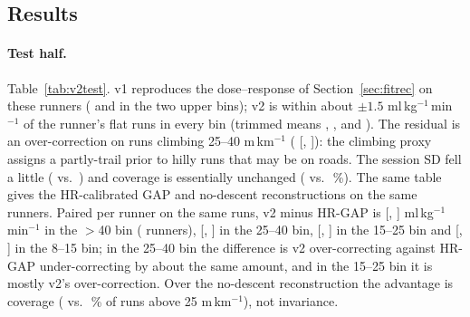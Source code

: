 \documentclass[11pt,a4paper]{article}
\newcommand{\unit}{ml\,kg$^{-1}$\,min$^{-1}$}
\begin{document}
\begin{table}[!htbp]\centering\footnotesize
\caption{Development half of the Endomondo runners (\nnVdevRunners{} runners): gap to the runner's flat runs in the 25--40 and $>$40 m\,km$^{-1}$ bins (10\,\% trimmed mean, \unit), session-to-session SD within runner on flat runs, share of runs above 25 m\,km$^{-1}$ with an estimate, and mean level on flat runs. No gait labels in every row.}\label{tab:v2dev}

\end{table}

\subsection{Results}\label{sec:v2res}
\paragraph{Test half.} Table~\ref{tab:v2test}. v1 reproduces the dose--response of Section~\ref{sec:fitrec} on these runners (\nvtestCOne{} and \nvtestDOne{} in the two upper bins); v2 is within about $\pm1.5$ \unit{} of the runner's flat runs in every bin (trimmed means \nvtestATwo, \nvtestBTwo, \nvtestCTwo{} and \nvtestDTwo). The residual is an over-correction on runs climbing 25--40 m\,km$^{-1}$ (\nvtestCTwo{} [\nvtestLoCTwo, \nvtestHiCTwo]): the climbing proxy assigns a partly-trail prior to hilly runs that may be on roads. The session SD fell a little (\nvtestSdTwo{} vs.\ \nvtestSdOne) and coverage is essentially unchanged (\nvtestCovTwo{} vs.\ \nvtestCovOne\,\%). The same table gives the HR-calibrated GAP and no-descent reconstructions on the same runners. Paired per runner on the same runs, v2 minus HR-GAP is \nvpairD{} [\nvpairLoD, \nvpairHiD] \unit{} in the $>$40 bin (\nvpairND{} runners), \nvpairC{} [\nvpairLoC, \nvpairHiC] in the 25--40 bin, \nvpairB{} [\nvpairLoB, \nvpairHiB] in the 15--25 bin and \nvpairA{} [\nvpairLoA, \nvpairHiA] in the 8--15 bin; in the 25--40 bin the difference is v2 over-correcting against HR-GAP under-correcting by about the same amount, and in the 15--25 bin it is mostly v2's over-correction. Over the no-descent reconstruction the advantage is coverage (\nvtestCovTwo{} vs.\ \nvtestCovGnodesc\,\% of runs above 25 m\,km$^{-1}$), not invariance.

\begin{table}[!htbp]\centering\scriptsize\setlength{\tabcolsep}{2.5pt}
\caption{Test half of the Endomondo runners (\nnVtestRunners{} runners): gap to the runner's flat runs of the same month by climbing bin (10\,\% trimmed mean [95\,\% CI of the mean] over runners, \unit), session SD within runner on flat runs and share of hilly runs with an estimate. v1 and v2 as defined above; the two reconstructions on the same runs. Valid: share of runs above 25 m\,km$^{-1}$ with an estimate.}\label{tab:v2test}

\end{table}
\end{document}
